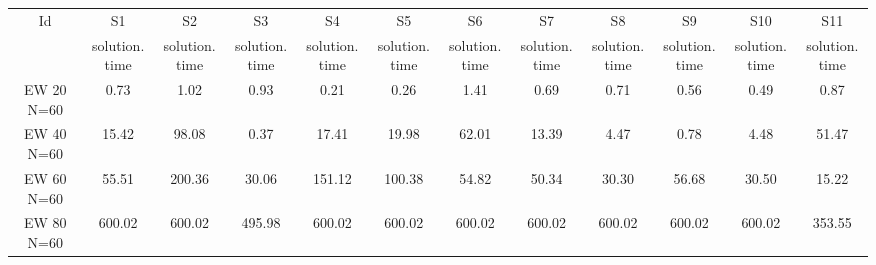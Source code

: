 \documentclass[landscape, 12pt]{report}
\begin{document}
\begin{tabular}{|c|c|c|c|c|c|c|c|c|c|c|c|}
\hline
\multicolumn{1}{|c|}{Id} & \multicolumn{1}{|c|}{S1} & \multicolumn{1}{|c|}{S2} & \multicolumn{1}{|c|}{S3} & \multicolumn{1}{|c|}{S4} & \multicolumn{1}{|c|}{S5} & \multicolumn{1}{|c|}{S6} & \multicolumn{1}{|c|}{S7} & \multicolumn{1}{|c|}{S8} & \multicolumn{1}{|c|}{S9} & \multicolumn{1}{|c|}{S10} & \multicolumn{1}{|c|}{S11}
\\
 & solution.time & solution.time & solution.time & solution.time & solution.time & solution.time & solution.time & solution.time & solution.time & solution.time & solution.time
\\
\hline
EW 20 N=60 & 0.73 & 1.02 & 0.93 & 0.21 & 0.26 & 1.41 & 0.69 & 0.71 & 0.56 & 0.49 & 0.87
\\
EW 40 N=60 & 15.42 & 98.08 & 0.37 & 17.41 & 19.98 & 62.01 & 13.39 & 4.47 & 0.78 & 4.48 & 51.47
\\
EW 60 N=60 & 55.51 & 200.36 & 30.06 & 151.12 & 100.38 & 54.82 & 50.34 & 30.30 & 56.68 & 30.50 & 15.22
\\
EW 80 N=60 & 600.02 & 600.02 & 495.98 & 600.02 & 600.02 & 600.02 & 600.02 & 600.02 & 600.02 & 600.02 & 353.55
\\
\hline 
 \end{tabular}

\clearpage
\end{document}
